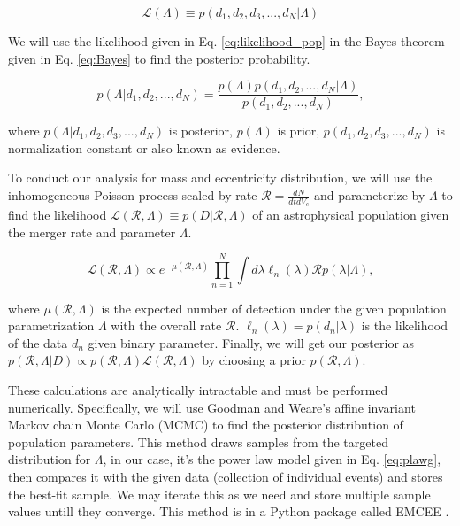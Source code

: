 \documentclass[twocolumn,prd,nofootinbib]{revtex4}
\begin{document}
\begin{equation}
\label{eq:likelihood_pop}    
\mathcal{L}(\Lambda)\equiv p(d_1,d_2,d_3,...,d_N|\Lambda)
\end{equation}

 

We will use the likelihood given in Eq. \ref{eq:likelihood_pop} in the Bayes theorem given in Eq. \ref{eq:Bayes} to find the posterior probability.

\begin{equation}
\label{eq:Bayes}    
p(\Lambda|d_1,d_2,...,d_N)= \frac{p(\Lambda)p(d_1,d_2,...,d_N|\Lambda)}{p(d_1,d_2,...,d_N)},
\end{equation}

where $p(\Lambda|d_1,d_2,d_3,...,d_N)$ is posterior, $p(\Lambda)$ is prior, $p(d_1,d_2,d_3,...,d_N)$ is normalization constant or also known as evidence.

To conduct our analysis for mass and eccentricity distribution, we will use the inhomogeneous Poisson process scaled by rate $\mathcal{R} = \frac{dN}{dtdV_c}$ and parameterize by $\Lambda$ to find the likelihood  $\mathcal{L}(\mathcal{R},\Lambda)\equiv p(D|\mathcal{R},\Lambda)$ of an astrophysical population given the merger rate and parameter $\Lambda$. 

\begin{equation}
\label{eq: likelihood}
\mathcal{L}(\mathcal{R},\Lambda) \propto e^{-\mu(\mathcal{R},\Lambda)}\prod_{n=1}^N\int d\lambda \ell_n(\lambda) \mathcal{R} p(\lambda|\Lambda),
\end{equation}

where $\mu(\mathcal{R},\Lambda)$ is the expected number of detection under the given population parametrization $\Lambda$ with the overall rate $\mathcal{R}$. $\ell_n(\lambda)=p(d_n|\lambda)$ is the likelihood of the data $d_n$ given binary parameter.
Finally, we will get our posterior as $p(\mathcal{R},\Lambda | D)\propto p(\mathcal{R},\Lambda)  \mathcal{L}(\mathcal{R},\Lambda)$ by choosing a prior $p(\mathcal{R},\Lambda)$.

These calculations are analytically intractable and must be performed numerically. Specifically, we will use Goodman and Weare's affine invariant Markov chain Monte Carlo (MCMC) \cite{mcmc_paper} to find the posterior distribution of population parameters. This method draws samples from the targeted distribution for $\Lambda$, in our case, it's the power law model given in Eq. \ref{eq:plawg}, then compares it with the given data (collection of individual events) and stores the best-fit sample. We may iterate this as we need and store multiple sample values untill they converge. 
This method is in a Python package called EMCEE \cite{emcee_paper}.
\end{document}
